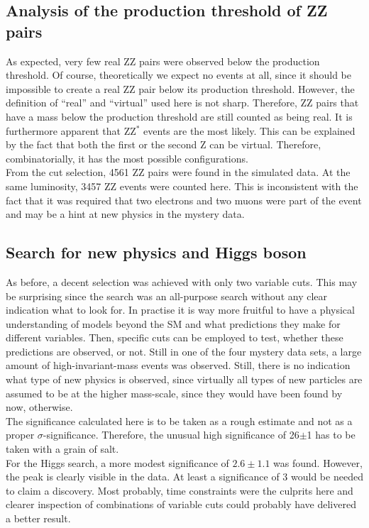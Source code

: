 \documentclass[twoside,        %
               BCOR12mm,       %
               ngerman,english, %
               fleqn,headsepline=false,footsepline=false
              ]{Vorlage/MFPREPORT}
\begin{document}
\subsection{Analysis of the production threshold of ZZ pairs}
As expected, very few real ZZ pairs were observed below the production
threshold. Of course, theoretically we expect no events at all, since it should
be impossible to create a real ZZ pair below its production threshold.
However, the definition of ``real'' and ``virtual'' used here is not sharp.
Therefore, ZZ pairs that have a mass below the production threshold are
still counted as being real. It is furthermore apparent that ZZ$^*$ events are
the most likely. This can be explained by the fact that both the first or the
second Z can be virtual. Therefore, combinatorially, it has the most possible
configurations.\\
From the cut selection, 4561 ZZ pairs were found in the simulated data. At the
same luminosity, 3457 ZZ events were counted here. This is inconsistent with the
fact that it was required that two electrons and two muons were part of the
event and may be a hint at new physics in the mystery data.

\subsection{Search for new physics and Higgs boson}
As before, a decent selection was achieved with only two variable cuts. This may
be surprising since the search was an all-purpose search without any clear
indication what to look for. In practise it is way more fruitful to have a
physical understanding of models beyond the SM and what predictions they make
for different variables. Then, specific cuts can be employed to test, whether
these predictions are observed, or not. Still in one of the four mystery data
sets, a large amount of high-invariant-mass events was observed. Still, there
is no indication what type of new physics is observed, since virtually all
types of new particles are assumed to be at the higher mass-scale, since they
would have been found by now, otherwise.\\
The significance calculated here is to be taken as a rough estimate and not as
a proper $\sigma$-significance. Therefore, the unusual high significance of
26$\pm$1 has to be taken with a grain of salt.\\
For the Higgs search, a more modest significance of $2.6\pm1.1$ was found.
However, the peak is clearly visible in the data. At least a significance of 3
would be needed to claim a discovery. Most probably, time constraints were the
culprits here and clearer inspection of combinations of variable cuts could
probably have delivered a better result.
\end{document}
